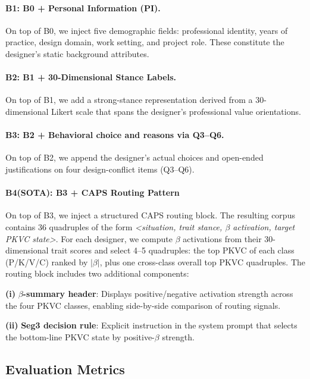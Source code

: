 \documentclass[11pt]{article}
\begin{document}
\paragraph{B1: B0 + Personal Information (PI).}
On top of B0, we inject five demographic fields: professional identity, years of practice, design domain, work setting, and project role. These constitute the designer's static background attributes.

\paragraph{B2: B1 + 30-Dimensional Stance Labels.}
On top of B1, we add a strong-stance representation derived from a
30-dimensional Likert scale that spans the designer's professional value orientations.
\paragraph{B3: B2 + Behavioral choice and reasons via Q3--Q6.}
On top of B2, we append the designer's actual choices and open-ended
justifications on four design-conflict items (Q3--Q6). 

\paragraph{B4(SOTA): B3 + CAPS Routing Pattern}
On top of B3, we inject a structured CAPS routing block. The resulting corpus contains 36 quadruples of the form \textit{<situation, trait stance, $\beta$ activation, target PKVC state>}. For each designer, we compute $\beta$ activations from their 30-dimensional trait scores and select 4--5 quadruples: the top PKVC of each class (P/K/V/C) ranked by $|\beta|$, plus one cross-class overall top PKVC quadruples. The routing block includes two additional components:

\textbf{(i)} \textbf{$\beta$-summary header}: Displays positive/negative activation strength across the four PKVC classes, enabling side-by-side comparison of routing signals.

\textbf{(ii)} \textbf{Seg3 decision rule}: Explicit instruction in the system prompt that selects the bottom-line PKVC state by positive-$\beta$ strength.


\subsection{Evaluation Metrics}
\end{document}

